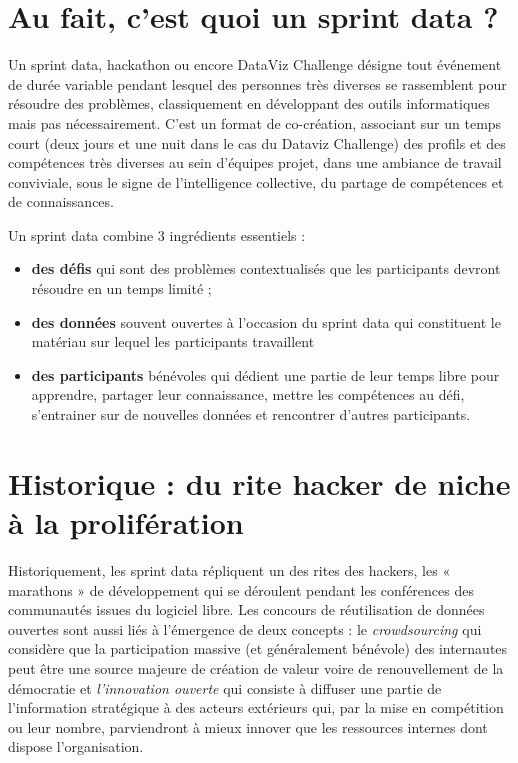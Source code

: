 \documentclass[]{book}
\begin{document}
\section{Au fait, c'est quoi un sprint data
?}\label{au-fait-cest-quoi-un-sprint-data}

Un sprint data, hackathon ou encore DataViz Challenge désigne tout
événement de durée variable pendant lesquel des personnes très diverses
se rassemblent pour résoudre des problèmes, classiquement en développant
des outils informatiques mais pas nécessairement. C'est un format de
co-création, associant sur un temps court (deux jours et une nuit dans
le cas du Dataviz Challenge) des profils et des compétences très
diverses au sein d'équipes projet, dans une ambiance de travail
conviviale, sous le signe de l'intelligence collective, du partage de
compétences et de connaissances.

Un sprint data combine 3 ingrédients essentiels :

\begin{itemize}
\item
  \textbf{des défis} qui sont des problèmes contextualisés que les
  participants devront résoudre en un temps limité ;
\item
  \textbf{des données} souvent ouvertes à l'occasion du sprint data qui
  constituent le matériau sur lequel les participants travaillent
\item
  \textbf{des participants} bénévoles qui dédient une partie de leur
  temps libre pour apprendre, partager leur connaissance, mettre les
  compétences au défi, s'entrainer sur de nouvelles données et
  rencontrer d'autres participants.
\end{itemize}

\section{Historique : du rite hacker de niche à la
prolifération}\label{historique-du-rite-hacker-de-niche-a-la-proliferation}

Historiquement, les sprint data répliquent un des rites des hackers, les
« marathons » de développement qui se déroulent pendant les conférences
des communautés issues du logiciel libre. Les concours de réutilisation
de données ouvertes sont aussi liés à l'émergence de deux concepts : le
\emph{crowdsourcing} qui considère que la participation massive (et
généralement bénévole) des internautes peut être une source majeure de
création de valeur voire de renouvellement de la démocratie et
\emph{l'innovation ouverte} qui consiste à diffuser une partie de
l'information stratégique à des acteurs extérieurs qui, par la mise en
compétition ou leur nombre, parviendront à mieux innover que les
ressources internes dont dispose l'organisation.
\end{document}

